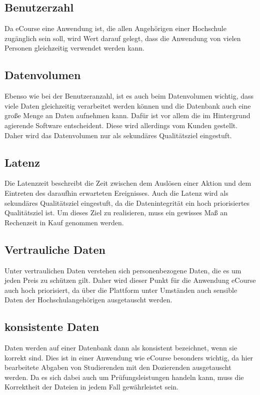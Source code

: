 \subsection{Benutzerzahl}
Da eCourse eine Anwendung ist, die allen Angehörigen einer Hochschule zugänglich sein soll, wird Wert darauf gelegt, dass die Anwendung von vielen Personen gleichzeitig verwendet werden kann.

\subsection{Datenvolumen}
Ebenso wie bei der Benutzeranzahl, ist es auch beim Datenvolumen wichtig, dass viele Daten gleichzeitig verarbeitet werden können und die Datenbank auch eine große Menge an Daten aufnehmen kann. Dafür ist vor allem die im Hintergrund agierende Software entscheident. Diese wird allerdings vom Kunden gestellt. Daher wird das Datenvolumen nur als sekundäres Qualitätsziel eingestuft.

\subsection{Latenz}
Die Latenzzeit beschreibt die Zeit zwischen dem Auslösen einer Aktion und dem Eintreten des daraufhin erwarteten Ereignisses.
Auch die Latenz wird als sekundäres Qualitätsziel eingestuft, da die Datenintegrität ein hoch priorisiertes Qualitätsziel ist. Um dieses Ziel zu realisieren, muss ein gewisses Maß an Rechenzeit in Kauf genommen werden.

\subsection{Vertrauliche Daten}
Unter vertraulichen Daten verstehen sich personenbezogene Daten, die es um jeden Preis zu schützen gilt. Daher wird dieser Punkt für die Anwendung eCourse auch hoch priorisiert, da über die Plattform unter Umständen auch sensible Daten der Hochschulangehörigen ausgetauscht werden.

\subsection{konsistente Daten}
Daten werden auf einer Datenbank dann als konsistent bezeichnet, wenn sie korrekt sind. Dies ist in einer Anwendung wie eCourse besonders wichtig, da hier \gls{bearbeitete Abgabe}n von \gls{Studierende}n mit den \gls{Dozierende}n ausgetauscht werden. Da es sich dabei auch um Prüfungsleistungen handeln kann, muss die Korrektheit der Dateien in jedem Fall gewährleistet sein.